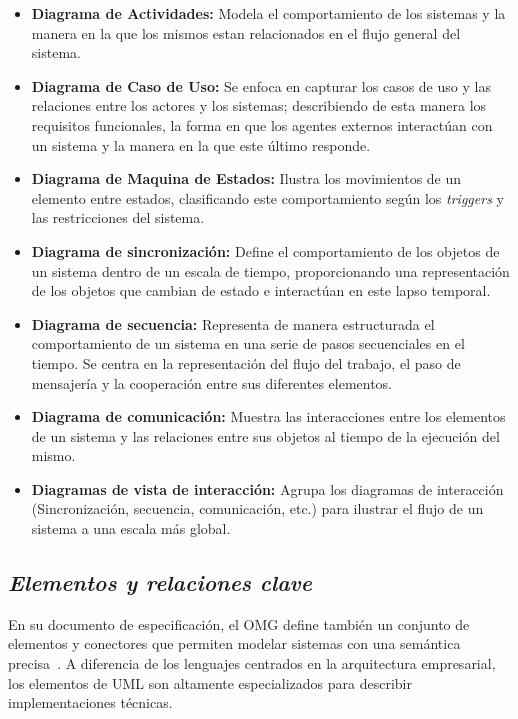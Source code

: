 \begin{itemize}
	\begin{itemize}
		\item \textbf{Diagrama de Actividades:} Modela el comportamiento de los sistemas y la manera en la que los mismos estan relacionados en el flujo general del sistema.
		\item \textbf{Diagrama de Caso de Uso:} Se enfoca en capturar los casos de uso y las relaciones entre los actores y los sistemas; describiendo de esta manera los requisitos funcionales, la forma en que los agentes externos interactúan con un sistema y la manera en la que este último  responde.
		\item \textbf{Diagrama de Maquina de Estados:} Ilustra los movimientos de un elemento entre estados, clasificando este comportamiento según los \textit{triggers} y las restricciones del sistema.
		\item \textbf{Diagrama de sincronización:} Define el comportamiento de los objetos de un sistema dentro de un escala de tiempo, proporcionando una representación de los objetos que cambian de estado e interactúan en este lapso temporal.
		\item \textbf{Diagrama de secuencia:} Representa de manera estructurada el comportamiento de un sistema en una serie de pasos secuenciales en el tiempo. Se centra en la representación del flujo del trabajo, el paso de mensajería y la cooperación entre sus diferentes elementos.
		\item \textbf{Diagrama de comunicación:} Muestra las interacciones entre los elementos de un sistema y las relaciones entre sus objetos al tiempo de la ejecución del mismo.
		\item \textbf{Diagramas de vista de interacción:} Agrupa los diagramas de interacción (Sincronización, secuencia, comunicación, etc.) para ilustrar el flujo de un sistema a una escala más global.  
	\end{itemize}
\end{itemize}

\subsection{\textit{Elementos y relaciones clave}}

En su documento de especificación, el OMG define también un conjunto de elementos y conectores que permiten modelar sistemas con una semántica precisa~\cite{OMG02}. A diferencia de los lenguajes centrados en la arquitectura empresarial, los elementos de UML son altamente especializados para describir implementaciones técnicas.

